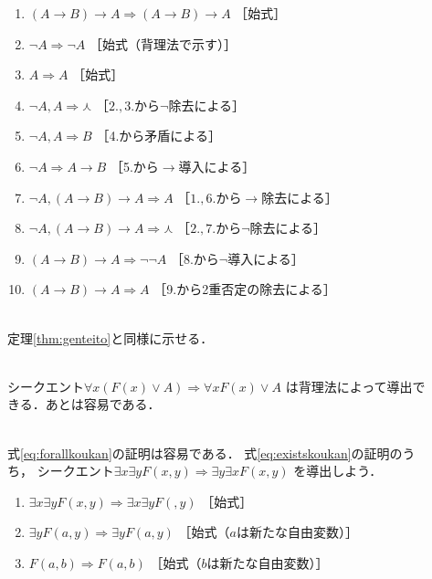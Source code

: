 \begin{description}
\item[] \mbox{}
  \begin{enumerate}[1. ]
    \item $(A \to B)  \to A \Longrightarrow (A \to B) \to A$ \quad ［始式］ 
    \item $\lnot A \Longrightarrow \lnot A$ \quad ［始式（背理法で示す）］
    \item $A \Longrightarrow A$ \quad ［始式］
    \item $\lnot A ,  A \Longrightarrow \curlywedge$ \quad ［$2., 3.$から$\lnot$除去による］
    \item $\lnot A ,  A \Longrightarrow B$ \quad ［4.から矛盾による］
    \item $\lnot A \Longrightarrow A \to B$ \quad ［5.から$\to$導入による］
    \item $\lnot A,  (A \to B) \to A \Longrightarrow A$ \quad ［$1., 6.$から$\to$除去による］ 
    \item $\lnot A,  (A \to B) \to A \Longrightarrow \curlywedge$
           \quad ［$2., 7.$から$\lnot$除去による］
    \item $(A \to B) \to A \Longrightarrow \lnot \lnot A$ \quad ［8.から$\lnot$導入による］
    \item $(A \to B) \to A \Longrightarrow A$ \quad ［9.から2重否定の除去による］
  \end{enumerate}
\item[] \mbox{} \\
  定理\ref{thm:genteito}と同様に示せる．
\item[] \mbox{} \\
  シークエント$\forall x (F(x) \lor A) \Longrightarrow \forall x F(x) \lor A$
  は背理法によって導出できる．あとは容易である．
\item[] \mbox{} \\
  式\eqref{eq:forallkoukan}の証明は容易である．
  式\eqref{eq:existskoukan}の証明のうち，
  シークエント$\exists x \exists y F(x,y) \Longrightarrow \exists y \exists x F(x,y)$
  を導出しよう．
  \begin{enumerate}[1. ]
    \item $\exists x \exists y F(x,y) \Longrightarrow \exists x \exists y F(,y)$
           \quad ［始式］
    \item $\exists y F(a, y) \Longrightarrow \exists y F(a,y)$
           \quad ［始式（$a$は新たな自由変数）］
    \item $F(a, b) \Longrightarrow F(a,b)$ \quad ［始式（$b$は新たな自由変数）］

\end{enumerate}
\end{description}
